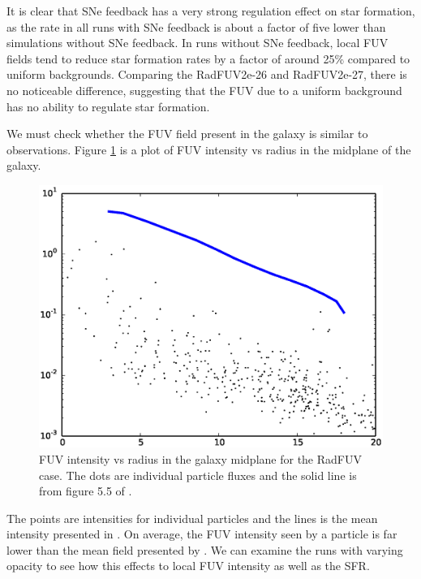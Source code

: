 It is clear that SNe feedback has a very strong regulation effect on star formation, as the rate in all runs with SNe feedback is about a factor of five lower than simulations without SNe feedback. In runs without SNe feedback, local FUV fields tend to reduce star formation rates by a factor of around 25\% compared to uniform backgrounds. Comparing the RadFUV2e-26 and RadFUV2e-27, there is no noticeable difference, suggesting that the FUV due to a uniform background has no ability to regulate star formation.

We must check whether the FUV field present in the galaxy is similar to observations. Figure \ref{fig:intensitywolfire} is a plot of FUV intensity vs radius in the midplane of the galaxy.

\begin{figure}
\includegraphics[width=\textwidth]{graphics/intensityvrRadFUV00200.eps}
\caption[FUV intensity vs radius]{FUV intensity vs radius in the galaxy midplane for the RadFUV case. The dots are individual particle fluxes and the solid line is from figure 5.5 of \citet{wolfireEt03}.}
\label{fig:intensitywolfire}
\end{figure}

The points are intensities for individual particles and the lines is the mean intensity presented in \citet{wolfireEt03}. On average, the FUV intensity seen by a particle is far lower than the mean field presented by \citet{wolfireEt03}. We can examine the runs with varying opacity to see how this effects to local FUV intensity as well as the SFR.


